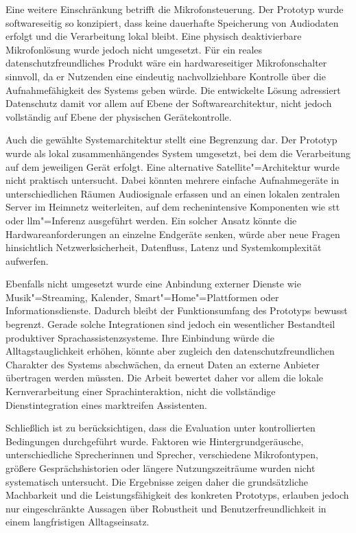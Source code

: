 Eine weitere Einschränkung betrifft die Mikrofonsteuerung. Der Prototyp wurde softwareseitig so konzipiert, dass keine dauerhafte Speicherung von Audiodaten erfolgt und die Verarbeitung lokal bleibt. Eine physisch deaktivierbare Mikrofonlösung wurde jedoch nicht umgesetzt. Für ein reales datenschutzfreundliches Produkt wäre ein hardwareseitiger Mikrofonschalter sinnvoll, da er Nutzenden eine eindeutig nachvollziehbare Kontrolle über die Aufnahmefähigkeit des Systems geben würde. Die entwickelte Lösung adressiert Datenschutz damit vor allem auf Ebene der Softwarearchitektur, nicht jedoch vollständig auf Ebene der physischen Gerätekontrolle.

Auch die gewählte Systemarchitektur stellt eine Begrenzung dar. Der Prototyp wurde als lokal zusammenhängendes System umgesetzt, bei dem die Verarbeitung auf dem jeweiligen Gerät erfolgt. Eine alternative Satellite"=Architektur wurde nicht praktisch untersucht. Dabei könnten mehrere einfache Aufnahmegeräte in unterschiedlichen Räumen Audiosignale erfassen und an einen lokalen zentralen Server im Heimnetz weiterleiten, auf dem rechenintensive Komponenten wie \gls{stt} oder \gls{llm}"=Inferenz ausgeführt werden. Ein solcher Ansatz könnte die Hardwareanforderungen an einzelne Endgeräte senken, würde aber neue Fragen hinsichtlich Netzwerksicherheit, Datenfluss, Latenz und Systemkomplexität aufwerfen.

Ebenfalls nicht umgesetzt wurde eine Anbindung externer Dienste wie Musik"=Streaming, Kalender, Smart"=Home"=Plattformen oder Informationsdienste. Dadurch bleibt der Funktionsumfang des Prototyps bewusst begrenzt. Gerade solche Integrationen sind jedoch ein wesentlicher Bestandteil produktiver Sprachassistenzsysteme. Ihre Einbindung würde die Alltagstauglichkeit erhöhen, könnte aber zugleich den datenschutzfreundlichen Charakter des Systems abschwächen, da erneut Daten an externe Anbieter übertragen werden müssten. Die Arbeit bewertet daher vor allem die lokale Kernverarbeitung einer Sprachinteraktion, nicht die vollständige Dienstintegration eines marktreifen Assistenten.

Schließlich ist zu berücksichtigen, dass die Evaluation unter kontrollierten Bedingungen durchgeführt wurde. Faktoren wie Hintergrundgeräusche, unterschiedliche Sprecherinnen und Sprecher, verschiedene Mikrofontypen, größere Gesprächshistorien oder längere Nutzungszeiträume wurden nicht systematisch untersucht. Die Ergebnisse zeigen daher die grundsätzliche Machbarkeit und die Leistungsfähigkeit des konkreten Prototyps, erlauben jedoch nur eingeschränkte Aussagen über Robustheit und Benutzerfreundlichkeit in einem langfristigen Alltagseinsatz.


